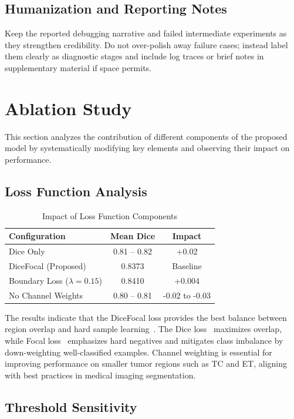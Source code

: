 \documentclass[conference]{IEEEtran}
\begin{document}
\subsection{Humanization and Reporting Notes}
Keep the reported debugging narrative and failed intermediate experiments as they strengthen credibility. Do not over-polish away failure cases; instead label them clearly as diagnostic stages and include log traces or brief notes in supplementary material if space permits.


\section{Ablation Study}

This section analyzes the contribution of different components of the proposed model by systematically modifying key elements and observing their impact on performance.

\subsection{Loss Function Analysis}

\begin{table}[htbp]
\centering
\caption{Impact of Loss Function Components}
\begin{tabular}{|l|c|c|}
\hline
\textbf{Configuration} & \textbf{Mean Dice} & \textbf{Impact} \\
\hline
Dice Only & 0.81 -- 0.82 & +0.02 \\
DiceFocal (Proposed) & 0.8373 & Baseline \\
Boundary Loss ($\lambda=0.15$) & 0.8410 & +0.004 \\
No Channel Weights & 0.80 -- 0.81 & -0.02 to -0.03 \\
\hline
\end{tabular}
\end{table}

The results indicate that the DiceFocal loss provides the best balance between region overlap and hard sample learning~\cite{12,13}. The Dice loss~\cite{12} maximizes overlap, while Focal loss~\cite{13} emphasizes hard negatives and mitigates class imbalance by down-weighting well-classified examples. Channel weighting is essential for improving performance on smaller tumor regions such as TC and ET, aligning with best practices in medical imaging segmentation.

\subsection{Threshold Sensitivity}
\end{document}
